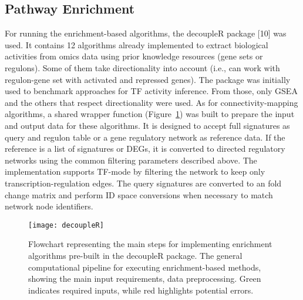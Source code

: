 \subsection{Pathway Enrichment} %
\label{sub:pathway_enrichment}


For running the enrichment-based algorithms, the decoupleR package [10] was used. 
It contains 12 algorithms already implemented to extract biological activities from omics data using prior knowledge resources (gene sets or regulons).
Some of them take directionality into account (i.e., can work with regulon-gene set with activated and repressed genes). 
The package was initially used to benchmark approaches for TF activity inference. From those, only GSEA and the others that respect directionality 
were used. As for connectivity-mapping algorithms, a shared wrapper function (Figure~\ref{fig:fig6}) was built to prepare the input and 
output data for these algorithms. It is designed to accept full signatures as query and regulon table or a gene regulatory network as reference data. 
If the reference is a list of signatures or DEGs, it is converted to directed regulatory networks using the common filtering parameters described above. 
The implementation supports TF-mode by filtering the network to keep only transcription-regulation edges. The query signatures are converted to an 
fold change matrix and perform ID space conversions when necessary to match network node identifiers. 

\begin{figure}[htbp]
    \centering
    \texttt{[image: decoupleR]}
    \caption{Flowchart representing the main steps for implementing enrichment algorithms pre-built in the decoupleR package. The general computational pipeline for executing enrichment-based methods, showing the main input requirements, data preprocessing. Green indicates required inputs, while red highlights potential errors.}
    \label{fig:fig6}
\end{figure}
